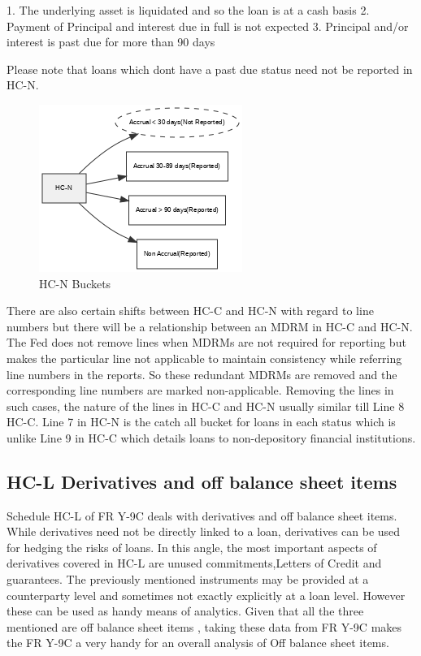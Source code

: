 \documentclass[conference]{IEEEtran}
\begin{document}
	1. The underlying asset is liquidated and so the loan is at a cash basis 
	2. Payment of Principal and interest due in full is not expected
	3. Principal and/or interest is past due for more than 90 days
	
	Please note that loans which dont have a past due status need not be reported in HC-N.
	
	\begin{figure}[htbp]
		\centerline{\includegraphics{hcn_flowchart.png}}
		\caption{HC-N Buckets}
		\label{fig}
	\end{figure}
	
	There are also certain shifts between HC-C and HC-N with regard to line numbers but there will be a relationship between an MDRM in HC-C and HC-N. The Fed does not remove lines when MDRMs are not required for reporting but makes the particular line not applicable to maintain consistency while referring line numbers in the reports. So these redundant MDRMs are removed and the corresponding line numbers are marked non-applicable. Removing the lines in such cases, the nature of the lines in HC-C and HC-N usually similar till Line 8 HC-C. Line 7 in HC-N is the catch all bucket for loans in each status which is unlike Line 9 in HC-C which details loans to non-depository financial institutions.
	
\subsection{HC-L Derivatives and off balance sheet items}
    Schedule HC-L of FR Y-9C deals with derivatives and off balance sheet items. While derivatives need not be directly linked to a loan, derivatives can be used for hedging the risks of loans. In this angle, the most important aspects of derivatives covered in HC-L are unused commitments,Letters of Credit and guarantees. The previously mentioned instruments may be provided at a counterparty level and sometimes not exactly explicitly at a loan level. However these can be used as handy means of analytics. Given that all the three mentioned are off balance sheet items , taking these data from FR Y-9C makes the FR Y-9C a very handy for an overall analysis of Off balance sheet items.
    
\end{document}
